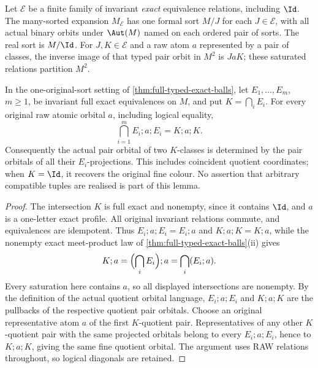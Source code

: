 \begin{definition}
Let $\mathcal E$ be a finite family of invariant \emph{exact}
equivalence relations, including $\Id$. The many-sorted expansion
$M_{\mathcal E}$ has one formal sort $M/J$ for each
$J\in\mathcal E$, with all actual binary orbits under
$\Aut(M)$ named on each ordered pair of sorts. The real sort is
$M/\Id$. For $J,K\in\mathcal E$ and a raw atom $a$ represented
by a pair of classes, the inverse image of that typed pair orbit
in $M^2$ is $JaK$; these saturated relations partition $M^2$.
\end{definition}

\begin{lemma}
\label{lem:exact-quotient-colour-meet}
In the one-original-sort setting of
\cref{thm:full-typed-exact-balls}, let $E_1,\ldots,E_m$, $m\ge1$,
be invariant full exact equivalences on $M$, and put
$K=\bigcap_i E_i$. For every original raw atomic orbital $a$,
including logical equality,
\[
             \bigcap_{i=1}^m E_i;a;E_i=K;a;K.
\]
Consequently the actual pair orbital of two $K$-classes is
determined by the pair orbitals of all their $E_i$-projections.
This includes coincident quotient coordinates; when $K=\Id$,
it recovers the original fine colour. No assertion that arbitrary
compatible tuples are realised is part of this lemma.
\end{lemma}
\begin{proof}
The intersection $K$ is full exact and nonempty, since it contains
$\Id$, and $a$ is a one-letter exact profile. All original invariant
relations commute, and equivalences are idempotent. Thus
$E_i;a;E_i=E_i;a$ and $K;a;K=K;a$, while the nonempty exact
meet-product law of \cref{thm:full-typed-exact-balls}(ii) gives
\[
          K;a=\Bigl(\bigcap_iE_i\Bigr);a
              =\bigcap_i(E_i;a).
\]
Every saturation here contains $a$, so all displayed intersections
are nonempty. By the definition of the actual quotient orbital
language, $E_i;a;E_i$ and $K;a;K$ are the pullbacks of the
respective quotient pair orbitals. Choose an original representative
atom $a$ of the first $K$-quotient pair. Representatives of any
other $K$-quotient pair with the same projected orbitals belong to
every $E_i;a;E_i$, hence to $K;a;K$, giving the same fine quotient
orbital. The argument uses
RAW relations throughout, so logical diagonals are retained.
\end{proof}


